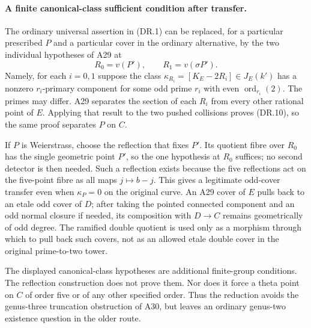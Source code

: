 \paragraph{A finite canonical-class sufficient condition after transfer.}
The ordinary universal assertion in (DR.1) can be replaced, for a
particular prescribed $P$ and a particular cover in the ordinary
alternative, by the two individual hypotheses of A29 at
\[
                 R_0=v(P'),\qquad R_1=v(\sigma P').
 \tag{DR.11}
\]
Namely, for each $i=0,1$ suppose the class
$\kappa_{R_i}=[K_E-2R_i]\in J_E(k')$ has a nonzero $r_i$-primary
component for some odd prime $r_i$ with even
$\operatorname{ord}_{r_i}(2)$.  The primes may differ.  A29 separates
the section of each $R_i$ from every other rational point of $E$.
Applying that result to the two pushed collisions proves (DR.10), so
the same proof separates $P$ on $C$.

If $P$ is Weierstrass, choose the reflection that fixes $P'$.  Its
quotient fibre over $R_0$ has the single geometric point $P'$, so the
one hypothesis at $R_0$ suffices; no second detector is then needed.
Such a reflection exists because the five reflections act on the
five-point fibre as all maps $j\mapsto b-j$.  This gives a legitimate
odd-cover transfer even when $\kappa_P=0$ on the original curve.
An A29 cover of $E$ pulls back to an etale odd cover of $D$; after
taking the pointed connected component and an odd normal closure if
needed, its composition with $D\to C$ remains geometrically of odd
degree.  The ramified double quotient is used only as a morphism
through which to pull back such covers, not as an allowed etale
double cover in the original prime-to-two tower.

The displayed canonical-class hypotheses are additional finite-group
conditions.  The reflection construction does not prove them.  Nor
does it force a theta point on $C$ of order five or of any other
specified order.  Thus the reduction avoids the genus-three
truncation obstruction of A30, but leaves an ordinary genus-two
existence question in the older route.

